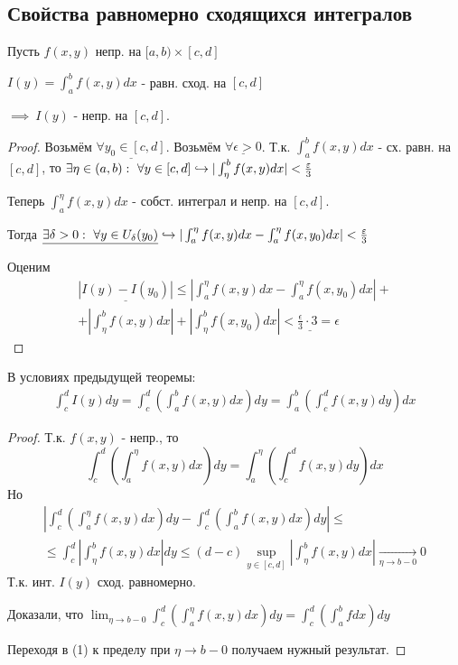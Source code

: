 \documentclass{article}
\begin{document}
\subsection{Свойства равномерно сходящихся интегралов}
\begin{theorem}[О непрерывности]
  Пусть $f(x,y)$ непр. на $[a,b)\times [c,d]$

  $I(y)=\int_{a}^{b}f(x,y)dx$ - равн. сход. на $[c,d]$

  $\implies \ I(y)$ - непр. на $[c,d]$.
\end{theorem}
\begin{proof}
  Возьмём $\underline{\forall y_0 \in [c,d]}$. Возьмём $\underline{\forall \epsilon>0}$.
  Т.к. $\int_{a}^{b}f(x,y)dx$ - сх. равн. на $[c,d]$, то
  $\exists \eta \in (a,b): \ \forall y \in [c,d] \hookrightarrow |\int_{\eta}^{b}f(x,y)dx|<\frac{\varepsilon}{3}$

  Теперь $\int_{a}^{\eta}f(x,y)dx$ - собст. интеграл и непр. на $[c,d]$.

  Тогда $\underline{\exists \delta >0: \ \forall y \in U_\delta(y_0)} \true |\int_{a}^{\eta}f(x,y)dx - \int_{a}^{\eta}f(x,y_0)dx|<\frac{\epsilon}{3}$

  Оценим
  \begin{gather*}
    \underline{|I(y) - I(y_0)|}\le |\int_{a}^{\eta}f(x,y)dx-\int_{a}^{\eta}f(x,y_0)dx| + \\ 
    + |\int_{\eta}^{b}f(x,y)dx|+|\int_{\eta}^{b}f(x,y_0)dx|\underline{< \frac{\epsilon}{3}\cdot 3 = \epsilon}
  \end{gather*}
\end{proof}
\begin{theorem}
  В условиях предыдущей теоремы:
  \begin{gather*}
    \int_{c}^{d}I(y)dy=\int_{c}^{d}(\int_{a}^{b}f(x,y)dx)dy=\int_{a}^{b}(\int_{c}^{d}f(x,y)dy)dx
  \end{gather*}
\end{theorem}
\begin{proof}
  Т.к. $f(x,y)$ - непр., то
  \[
    \int_{c}^{d}(\int_{a}^{\eta}f(x,y)dx)dy=\int_{a}^{\eta}(\int_{c}^{d}f(x,y)dy)dx \tag{1}
  \]
  Но
  \begin{gather*}
    |\int_{c}^{d}(\int_{a}^{\eta}f(x,y)dx)dy-\int_{c}^{d}(\int_{a}^{b}f(x,y)dx)dy| \le \\ 
    \le \int_{c}^{d}|\int_{\eta}^{b}f(x,y)dx|dy \le (d-c)\sup_{y\in [c,d]}|\int_{\eta}^{b}f(x,y)dx|\underset{\eta\to b-0}{\to}0
  \end{gather*}
  Т.к. инт. $I(y)$ сход. равномерно.

  Доказали, что $\lim_{\eta\to b-0}\int_{c}^{d}(\int_{a}^{\eta}f(x,y)dx)dy=\int_{c}^{d}(\int_{a}^{b}fdx)dy$

  Переходя в (1) к пределу при $\eta\to b-0$ получаем нужный результат.
\end{proof}
\end{document}
